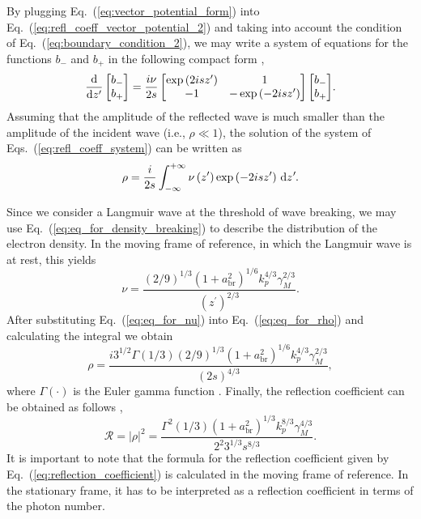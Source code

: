 \documentclass[10pt, a4paper, twoside, openright]{report}
\newcommand{\norm}[1]{|#1|}
\begin{document}
By plugging Eq.~(\ref{eq:vector_potential_form}) into Eq.~(\ref{eq:refl_coeff_vector_potential_2}) and taking into account the condition of Eq.~(\ref{eq:boundary_condition_2}), we may write a system of equations for the functions $ b_{-} $ and $  b_{+} $ in the following compact form \cite{Bulanov2013},
\begin{equation}\label{eq:refl_coeff_system}
\diff*
{\begin{bmatrix}
	b_{-} \\
	b_{+} 
\end{bmatrix}}
{z^{\prime}} = \frac{i \nu}{2 s} 
\begin{bmatrix}
	\exp \left( 2 i s z^{\prime} \right) & 1 \\
	-1 & -\exp \left( -2 i s z^{\prime} \right)
\end{bmatrix}
{\begin{bmatrix}
	b_{-} \\
	b_{+}
\end{bmatrix}}.
\end{equation}
Assuming that the amplitude of the reflected wave is much smaller than the amplitude of the incident wave (i.e., $ \rho \ll 1 $), the solution of the system of Eqs.~(\ref{eq:refl_coeff_system}) can be written as \cite{Bulanov2013}
\begin{equation}\label{eq:eq_for_rho}
	\rho = \frac{i}{2 s} \int_{-\infty}^{+\infty} \nu \left( z^{\prime} \right) \exp \left( -2 i s z^{\prime} \right) \dl z^{\prime}.
\end{equation}

Since we consider a Langmuir wave at the threshold of wave breaking, we may use Eq.~(\ref{eq:eq_for_density_breaking}) to describe the distribution of the electron density. In the moving frame of reference, in which the Langmuir wave is at rest, this yields \cite{Bulanov2013}
\begin{equation}\label{eq:eq_for_nu}
\nu = \frac{\left( 2 / 9 \right)^{1/3} \left( 1 + a_{\mathrm{br}}^2 \right)^{1/6} k_p^{4/3} \gamma_M^{2/3}}{\left( z^{\prime} \right)^{2/3}}.
\end{equation} 
After substituting Eq.~(\ref{eq:eq_for_nu}) into Eq.~(\ref{eq:eq_for_rho}) and calculating the integral we obtain \cite{Bulanov2013}
\begin{equation}\label{eq:eq_for_rho_2}
\rho = \frac{i 3^{1 / 2} \Gamma \left( 1 / 3 \right) \left( 2 / 9 \right)^{1/3} \left( 1 + a_{\mathrm{br}}^2 \right)^{1/6} k_p^{4/3} \gamma_M^{2/3}}{\left( 2 s \right)^{4 / 3}},
\end{equation}
where $ \Gamma \left( \cdot \right) $ is the Euler gamma function \cite{Gradshteyn1965}. Finally, the reflection coefficient can be obtained as follows \cite{Bulanov2013},
\begin{equation}\label{eq:reflection_coefficient}
\mathcal{R} = \norm{\rho}^2 = \frac{\Gamma^2 \left( 1 / 3 \right) \left( 1 + a_{\mathrm{br}}^2 \right)^{1 / 3} k_p^{8/3} \gamma_M^{4/3}}{2^2 3^{1 / 3} s^{8 / 3}}.
\end{equation}
It is important to note that the formula for the reflection coefficient given by Eq.~(\ref{eq:reflection_coefficient}) is calculated in the moving frame of reference. In the stationary frame, it has to be interpreted as a reflection coefficient in terms of the photon number. 
\end{document}
